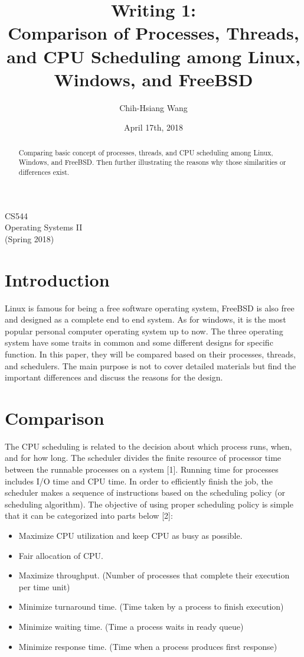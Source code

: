 \documentclass[10pt,draftclsnofoot,journal,compsoc,onecolumn]{IEEEtran}
\title{Writing 1: \\
Comparison of Processes, Threads, and CPU Scheduling among Linux, Windows, and FreeBSD}
\author{
  Chih-Hsiang Wang
}
\date{April 17th, 2018}
\begin{document}
\begin{titlepage} 
\maketitle
\begin{center}
CS544\\
Operating Systems II\\
(Spring 2018)
\vspace{50 mm}
\end{center}

\begin{abstract}
Comparing basic concept of processes, threads, and CPU scheduling among Linux, Windows, and FreeBSD. Then further illustrating the reasons why those similarities or differences exist.
\end{abstract}
\end{titlepage}

\section{Introduction}
Linux is famous for being a free software operating system, FreeBSD is also free and designed as a complete end to end system. As for windows, it is the most popular personal computer operating system up to now. The three operating system have some traits in common and some different designs for specific function. In this paper, they will be compared based on their processes, threads, and schedulers. The main purpose is not to cover detailed materials but find the important differences and discuss the reasons for the design.

\section{Comparison}
The CPU scheduling is related to the decision about which process runs, when, and for how long. The scheduler divides the finite resource of processor time between the runnable processes on a system [1]. Running time for processes includes I/O time and CPU time. In order to efficiently finish the job, the scheduler makes a sequence of instructions based on the scheduling policy (or scheduling algorithm). The objective of using proper scheduling policy is simple that it can be categorized into parts below [2]:

\begin{itemize}
  \item Maximize CPU utilization and keep CPU as busy as possible.
  \item Fair allocation of CPU.
  \item Maximize throughput. (Number of processes that complete their execution per time unit)
  \item Minimize turnaround time. (Time taken by a process to finish execution)
  \item Minimize waiting time. (Time a process waits in ready queue)
  \item Minimize response time. (Time when a process produces first response)
\end{itemize}
\end{document}
